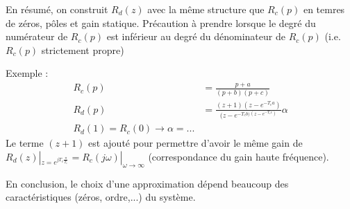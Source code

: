 \documentclass[main.tex]{subfiles}
\begin{document}
En résumé, on construit $R_d(z)$ avec la même structure que $R_c(p)$ en temres de zéros, pôles et gain statique.
Précaution à prendre lorsque le degré du numérateur de $R_c(p)$ est inférieur au degré du dénominateur de $R_c(p)$ (i.e. $R_c(p)$ strictement propre)

Exemple :
\begin{align*}
R_c(p) & = \frac{p+a}{(p+b)(p+c)} \\
R_d(p) & = \frac{(z+1)(z - e^{-T_ea})}{(z-e^{-T_eb)(z-e^{-T_ec})}}\alpha \\
R_d(1) = R_c(0) \rightarrow \alpha = ...
\end{align*}
Le terme $(z+1)$ est ajouté pour permettre d'avoir le même gain de $R_d(z)|_{z=e^{jT_e\frac{\pi}{T_e}}} = R_c(j\omega)|_{\omega \rightarrow \infty}$ (correspondance du gain haute fréquence).

En conclusion, le choix d'une approximation dépend beaucoup des caractéristiques (zéros, ordre,...) du système.
\end{document}

